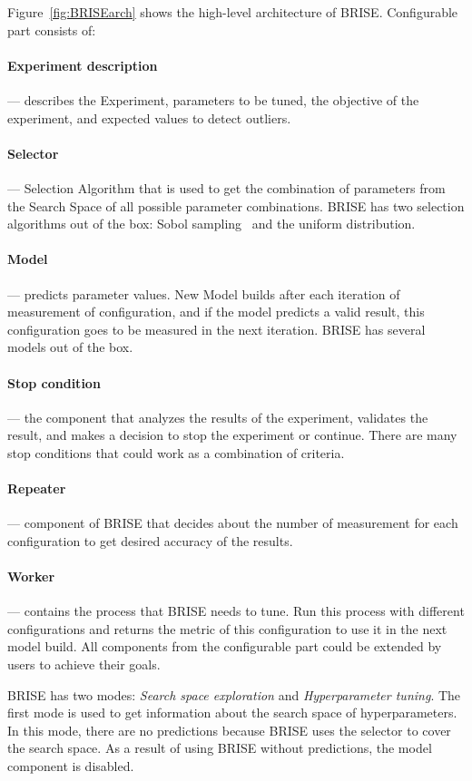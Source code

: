 Figure~\ref{fig:BRISEarch} shows the high-level architecture of BRISE.
Configurable part consists of:
\paragraph{Experiment description} — describes the Experiment, parameters to be tuned, the objective of the experiment, and expected values to detect outliers.
\paragraph{Selector} — Selection Algorithm that is used to get the combination of parameters from the Search Space of all possible parameter combinations. BRISE has two selection algorithms out of the box: Sobol sampling~\cite{sobol99} and the uniform distribution. 
\paragraph{Model} — predicts parameter values. New Model builds after each iteration of measurement of configuration, and if the model predicts a valid result, this configuration goes to be measured in the next iteration. BRISE has several models out of the box.
\paragraph{Stop condition} — the component that analyzes the results of the experiment, validates the result, and makes a decision to stop the experiment or continue. There are many stop conditions that could work as a combination of criteria.
\paragraph{Repeater} — component of BRISE that decides about the number of measurement for each configuration to get desired accuracy of the results. 
\paragraph{Worker} — contains the process that BRISE needs to tune. Run this process with different configurations and returns the metric of this configuration to use it in the next model build.
All components from the configurable part could be extended by users to achieve their goals.

BRISE has two modes: \textit{Search space exploration} and \textit{Hyperparameter tuning}.
The first mode is used to get information about the search space of hyperparameters. In this mode, there are no predictions because BRISE uses the selector to cover the search space. As a result of using BRISE without predictions, the model component is disabled.

